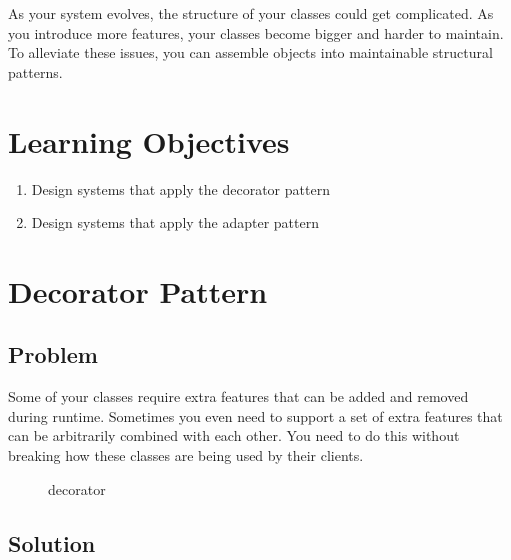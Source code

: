 As your system evolves, the structure of your classes could get
complicated. As you introduce more features, your classes become bigger
and harder to maintain. To alleviate these issues, you can assemble
objects into maintainable structural patterns.

\section{Learning
Objectives}\label{structural-patterns.md__learning-objectives}

\begin{enumerate}
\def\labelenumi{\arabic{enumi}.}
\tightlist
\item
  Design systems that apply the decorator pattern
\item
  Design systems that apply the adapter pattern
\end{enumerate}

\section{Decorator
Pattern}\label{structural-patterns.md__decorator-pattern}

\subsection{Problem}\label{structural-patterns.md__problem}

Some of your classes require extra features that can be added and
removed during runtime. Sometimes you even need to support a set of
extra features that can be arbitrarily combined with each other. You
need to do this without breaking how these classes are being used by
their clients.

\begin{figure}
\centering
{}
\caption{decorator}
\end{figure}

\subsection{Solution}\label{structural-patterns.md__solution}

